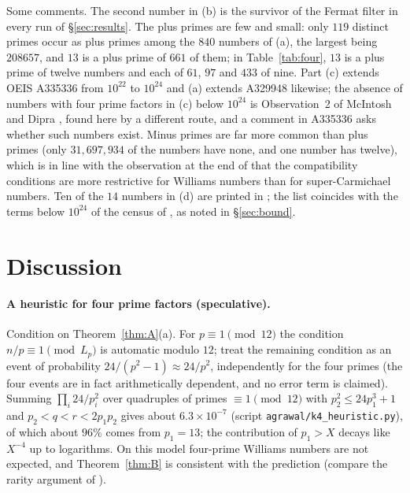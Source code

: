 \documentclass[11pt]{amsart}
\theoremstyle{definition}
\theoremstyle{remark}
\begin{document}
Some comments. The second number in (b) is the survivor of the Fermat filter in every run of \S\ref{sec:results}. The plus primes are few and small: only $119$ distinct primes occur as plus primes among the $840$ numbers of (a), the largest being $208657$, and $13$ is a plus prime of $661$ of them; in Table~\ref{tab:four}, $13$ is a plus prime of twelve numbers and each of $61$, $97$ and $433$ of nine. Part (c) extends OEIS A335336 from $10^{22}$ to $10^{24}$ and (a) extends A329948 likewise; the absence of numbers with four prime factors in (c) below $10^{24}$ is Observation~2 of McIntosh and Dipra \cite{MD15}, found here by a different route, and a comment in A335336 asks whether such numbers exist. Minus primes are far more common than plus primes (only $31{,}697{,}934$ of the numbers have none, and one number has twelve), which is in line with the observation at the end of \cite{McIntosh14} that the compatibility conditions are more restrictive for Williams numbers than for super-Carmichael numbers. Ten of the $14$ numbers in (d) are printed in \cite{McIntosh14}; the list coincides with the terms below $10^{24}$ of the census of \cite{Pud28,Pud30}, as noted in \S\ref{sec:bound}.

\section{Discussion}\label{sec:disc}

\paragraph{A heuristic for four prime factors (speculative).} Condition on Theorem~\ref{thm:A}(a). For $p\equiv1\pmod{12}$ the condition $n/p\equiv1\pmod{L_p}$ is automatic modulo $12$; treat the remaining condition as an event of probability $24/(p^2-1)\approx24/p^2$, independently for the four primes (the four events are in fact arithmetically dependent, and no error term is claimed). Summing $\prod_i24/p_i^2$ over quadruples of primes $\equiv1\pmod{12}$ with $p_2^2\le24p_1^3+1$ and $p_2<q<r<2p_1p_2$ gives about $6.3\times10^{-7}$ (script \texttt{agrawal/k4\_heuristic.py}), of which about $96\%$ comes from $p_1=13$; the contribution of $p_1>X$ decays like $X^{-4}$ up to logarithms. On this model four-prime Williams numbers are not expected, and Theorem~\ref{thm:B} is consistent with the prediction (compare the rarity argument of \cite[\S4]{MD15}).
\end{document}
